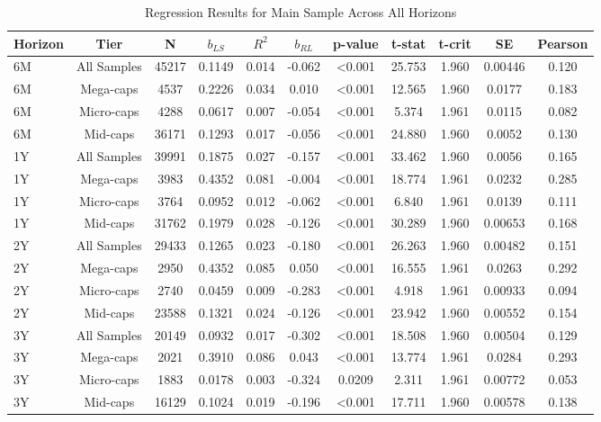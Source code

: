 \documentclass[11pt]{article}
\begin{document}
\begin{table}[!htbp]
\centering
\caption{Regression Results for Main Sample Across All Horizons}
\label{tab:regression-all}
\small
\begin{tabular}{lcccccccccc}
\toprule
Horizon & Tier & N & $b_{LS}$ & $R^2$ & $b_{RL}$ & p-value & t-stat & t-crit & SE & Pearson \\
\midrule
6M  & All Samples & 45217 & 0.1149 & 0.014 & -0.062 & <0.001 & 25.753 & 1.960 & 0.00446 & 0.120 \\
6M  & Mega-caps   & 4537  & 0.2226 & 0.034 &  0.010 & <0.001  & 12.565 & 1.960 & 0.0177  & 0.183 \\
6M  & Micro-caps  & 4288  & 0.0617 & 0.007 & -0.054 & <0.001    &  5.374 & 1.961 & 0.0115  & 0.082 \\
6M  & Mid-caps    & 36171 & 0.1293 & 0.017 & -0.056 & <0.001 & 24.880 & 1.960 & 0.0052  & 0.130 \\
\midrule
1Y  & All Samples & 39991 & 0.1875 & 0.027 & -0.157 & <0.001 & 33.462 & 1.960 & 0.0056  & 0.165 \\
1Y  & Mega-caps   & 3983  & 0.4352 & 0.081 & -0.004 & <0.001  & 18.774 & 1.961 & 0.0232  & 0.285 \\
1Y  & Micro-caps  & 3764  & 0.0952 & 0.012 & -0.062 & <0.001  &  6.840 & 1.961 & 0.0139  & 0.111 \\
1Y  & Mid-caps    & 31762 & 0.1979 & 0.028 & -0.126 & <0.001 & 30.289 & 1.960 & 0.00653 & 0.168 \\
\midrule
2Y  & All Samples & 29433 & 0.1265 & 0.023 & -0.180 & <0.001 & 26.263 & 1.960 & 0.00482 & 0.151 \\
2Y  & Mega-caps   & 2950  & 0.4352 & 0.085 &  0.050 & <0.001  & 16.555 & 1.961 & 0.0263  & 0.292 \\
2Y  & Micro-caps  & 2740  & 0.0459 & 0.009 & -0.283 & <0.001   &  4.918 & 1.961 & 0.00933 & 0.094 \\
2Y  & Mid-caps    & 23588 & 0.1321 & 0.024 & -0.126 & <0.001 & 23.942 & 1.960 & 0.00552 & 0.154 \\
\midrule
3Y  & All Samples & 20149 & 0.0932 & 0.017 & -0.302 & <0.001  & 18.508 & 1.960 & 0.00504 & 0.129 \\
3Y  & Mega-caps   & 2021  & 0.3910 & 0.086 &  0.043 & <0.001  & 13.774 & 1.961 & 0.0284  & 0.293 \\
3Y  & Micro-caps  & 1883  & 0.0178 & 0.003 & -0.324 & 0.0209                  &  2.311 & 1.961 & 0.00772 & 0.053 \\
3Y  & Mid-caps    & 16129 & 0.1024 & 0.019 & -0.196 & <0.001  & 17.711 & 1.960 & 0.00578 & 0.138 \\
\bottomrule
\end{tabular}
\end{table}
\end{document}
